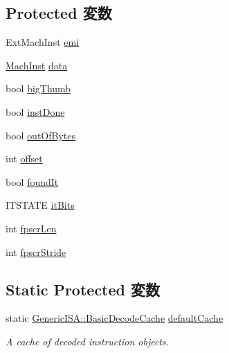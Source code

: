 \subsection*{Protected 変数}
\begin{DoxyCompactItemize}
\item 
ExtMachInst \hyperlink{classArmISA_1_1Decoder_abf211faf305b89c9093b00b6b82b0bd1}{emi}
\item 
\hyperlink{namespaceArmISA_a301c22ea09fa33dcfe6ddf22f203699c}{MachInst} \hyperlink{classArmISA_1_1Decoder_a6cb2e7b7aa0d014000d68a67fd4d46f4}{data}
\item 
bool \hyperlink{classArmISA_1_1Decoder_ae09c07b6fbf20072768c5008f1c28c8d}{bigThumb}
\item 
bool \hyperlink{classArmISA_1_1Decoder_a37c5d55785204b8fd00a8ebf62e1fc33}{instDone}
\item 
bool \hyperlink{classArmISA_1_1Decoder_a281c9bc4944bdbf837d5432478d43273}{outOfBytes}
\item 
int \hyperlink{classArmISA_1_1Decoder_aed7ea92f45bd273dde380a45ddced592}{offset}
\item 
bool \hyperlink{classArmISA_1_1Decoder_a9bc3a8de7ebc042ce01e139b0a15198d}{foundIt}
\item 
ITSTATE \hyperlink{classArmISA_1_1Decoder_a638ffaf97a6fd828d122ad8dbfff2e7b}{itBits}
\item 
int \hyperlink{classArmISA_1_1Decoder_a264c17f3f3faba0dc2ec4ee34c97222f}{fpscrLen}
\item 
int \hyperlink{classArmISA_1_1Decoder_af2c81439e9d1243892ac2258c052e119}{fpscrStride}
\end{DoxyCompactItemize}
\subsection*{Static Protected 変数}
\begin{DoxyCompactItemize}
\item 
static \hyperlink{classGenericISA_1_1BasicDecodeCache}{GenericISA::BasicDecodeCache} \hyperlink{classArmISA_1_1Decoder_a8800313f93afe356e1177866068cc8d6}{defaultCache}
\begin{DoxyCompactList}\small\item\em A cache of decoded instruction objects. \item\end{DoxyCompactList}\end{DoxyCompactItemize}


